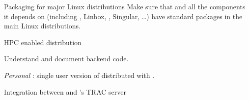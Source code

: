\begin{workpackage}[id=component-architecture,wphases=0-48!.5,
  title=Component Architecture,lead=UV,
  PSRM=24,UVRM=8,SARM=16, USHRM=4, USORM=6]
\begin{wpdelivs}
    \begin{wpdeliv}[due=48,id=sage-distribution,dissem=PU,nature=OTHER]
      {Packaging for major Linux distributions} Make sure that \Sage and
      all the components it depends on (including \GAP,
      Linbox, \PariGP, Singular, \dots) have standard packages in the
      main Linux distributions.
    \end{wpdeliv}


    \begin{wpdeliv}[due=48,id=hpc-configure,dissem=PU,nature=OTHER]
      {HPC enabled \Sage distribution}
    \end{wpdeliv}

    \begin{wpdeliv}[due=6,id=smc-documentation,dissem=PU,nature=R]
      {Understand and document \SMC backend code.}
    \end{wpdeliv}%

    \begin{wpdeliv}[due=24,id=personal-smc,dissem=PU,nature=OTHER]
      {\emph{Personal} \SMC: single user version of \SMC distributed
        with \Sage.}
    \end{wpdeliv}%

    \begin{wpdeliv}[due=24,id=smc-trac,dissem=PU,nature=OTHER]
      {Integration between \SMC and \Sage's TRAC server}
    \end{wpdeliv}
  \end{wpdelivs}






\end{workpackage}
